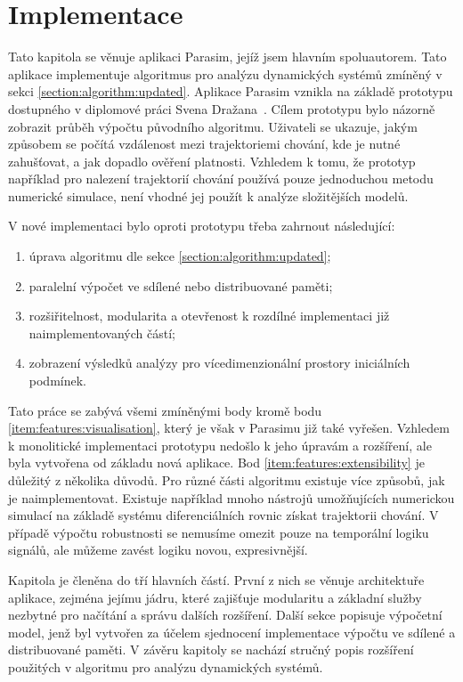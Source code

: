 \chapter{Implementace}\label{chapter:implementation}

Tato kapitola se věnuje aplikaci Parasim, jejíž jsem hlavním spoluautorem.
Tato aplikace implementuje algoritmus pro
analýzu dynamických systémů zmíněný v sekci \ref{section:algorithm:updated}. Aplikace Parasim
vznikla na základě prototypu dostupného v diplomové práci Svena Dražana~\cite{drazan2011}. Cílem prototypu bylo ná\-zor\-ně
zobrazit průběh výpočtu původního algoritmu. Uživateli se ukazuje, jakým způsobem
se počítá vzdá\-le\-nost mezi trajektoriemi chování, kde je nutné zahušťovat, a jak dopadlo
ověření platnosti. Vzhledem k tomu, že prototyp například pro nalezení trajektorií chování používá pouze jednoduchou metodu
numerické simulace, není vhodné jej použít k analýze slo\-ži\-těj\-ších modelů.

V nové implementaci bylo oproti prototypu třeba zahrnout následující:

\begin{enumerate}
	\item	úprava algoritmu dle sekce \ref{section:algorithm:updated};
	\item	paralelní výpočet ve sdílené nebo distribuované paměti;
	\item	rozšiřitelnost, modularita a otevřenost k rozdílné implementaci již naimplementovaných částí;\label{item:features:extensibility}
	\item	zobrazení výsledků analýzy pro vícedimenzionální prostory ini\-ciál\-ních podmínek.\label{item:features:visualisation}
\end{enumerate}

Tato práce se zabývá všemi zmíněnými body kromě bodu \ref{item:features:visualisation},
který je však v Parasimu již také vyřešen. Vzhledem k monolitické implementaci prototypu
nedošlo k jeho úpravám a rozšíření, ale byla vytvořena od základu nová aplikace.
Bod \ref{item:features:extensibility} je důležitý z několika důvodů. Pro různé části algoritmu
existuje více způsobů, jak je naimplementovat. Existuje například mnoho nástrojů umožňujících
numerickou simulací na základě systému diferenciálních rovnic získat trajektorii chování.
V případě výpočtu robustnosti se nemusíme omezit pouze na temporální logiku signálů,
ale můžeme zavést logiku novou, expresivněj\-ší.

Kapitola je členěna do tří hlavních částí. První z nich se věnuje architektuře aplikace,
zejména jejímu jádru, které zajišťuje modularitu a základní služby nezbytné pro načítání
a správu dalších rozšíření. Další sekce popisuje výpočetní model,
jenž byl vytvořen za účelem sjednocení implementace výpočtu ve sdílené a distribuované paměti.
V závěru kapitoly se na\-chá\-zí stručný popis rozšíření použitých v algoritmu pro analýzu
dynamických systémů.

